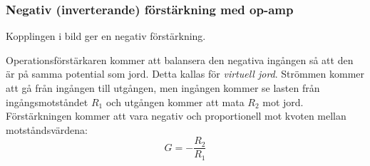 \subsubsection{Negativ (inverterande) förstärkning med op-amp}
\label{inverterande foerstaerkning}
\label{virtuell jord}
\label{jordning!virtuell}

Kopplingen i bild  ger en negativ förstärkning.


Operationsförstärkaren kommer att balansera den negativa ingången så att den
är på samma potential som jord.
Detta kallas för \emph{virtuell jord}.
Strömmen kommer att gå från ingången till utgången, men ingången kommer se
lasten från ingångsmotståndet \(R_1\) och utgången kommer att mata \(R_2\) mot
jord.
Förstärkningen kommer att vara negativ och proportionell mot kvoten mellan
motståndsvärdena:
\[G = -\dfrac{R_2}{R_1}\]
